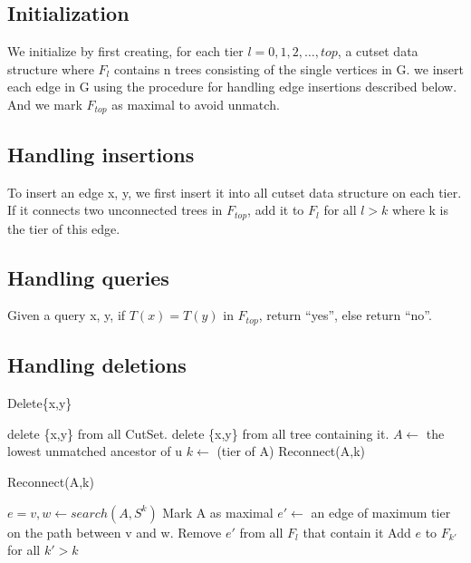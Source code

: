 \documentclass[conference,compsoc]{IEEEtran}
\begin{document}
\subsection{Initialization}
We initialize by first creating, for each tier $l = 0, 1,2, \dots , top$, a cutset data structure where $F_l$ contains n trees consisting of the single vertices in G. we insert each edge in G using the procedure for handling edge insertions described below. And we mark $F_{top}$ as maximal to avoid unmatch.
\subsection{Handling insertions}
To insert an edge {x, y}, we first insert it into all cutset data structure on each tier. If it connects two unconnected trees in $F_{top}$, add it to $F_l$ for all $l > k$ where k is the tier of this edge.
\subsection{Handling queries}
Given a query {x, y}, if $T(x) = T(y)$ in $F_{top}$, return “yes”, else return “no”.
\subsection{Handling deletions}
\begin{algorithm}[H]
\caption{Delete\{x,y\}}
\begin{algorithmic}[1]
\State delete \{x,y\} from all CutSet.
\State delete \{x,y\} from all tree containing it.
			\State $A \gets$ the lowest unmatched ancestor of u
			\State $k \gets$ (tier of A)
			\State Reconnect(A,k)
		\EndWhile
	\EndFor


\end{algorithmic}
\end{algorithm}
\begin{algorithm}
\caption{Reconnect(A,k)}
\begin{algorithmic}[1]
\State $e = {v,w} \gets search(A,S^k)$
		\State Mark A as maximal
	\Else
			\State $e' \gets$ an edge of maximum tier on the path between v and w.
			\State Remove $e'$ from all $F_l$ that contain it
		\EndIf
		\State Add $e$ to $F_{k'}$ for all $k' > k$
	\EndIf


\end{algorithmic}

\end{algorithm}
\end{document}
